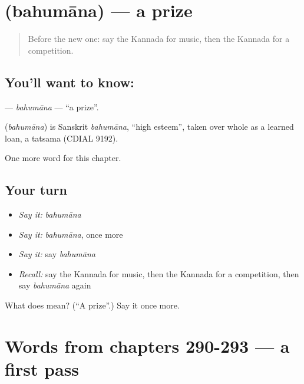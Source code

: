 \section[\texorpdfstring{\kn{ಬಹುಮಾನ} (bahumāna)}{ಬಹುಮಾನ (bahumāna)}]{ (bahumāna) — a prize}

\label{lesson:KA-C298-bahumana}



\begin{quote}
Before the new one: say the Kannada for music, then the Kannada for a competition.
\end{quote}

\subsection*{You'll want to know: }
\textbf{} — \emph{bahumāna} — \textquotedblleft{}a prize\textquotedblright{}.

\begin{cousinweb}
\textbf{} (\emph{bahumāna}) is Sanskrit \emph{bahumāna}, \textquotedblleft{}high esteem\textquotedblright{}, taken over whole as a learned loan, a tatsama (CDIAL 9192).
\end{cousinweb}

\begin{grammarlens}[title={What you've built}]
One more word for this chapter.
\end{grammarlens}

\subsection*{Your turn}
\begin{itemize}
\raggedright
  \item \emph{Say it:} \emph{bahumāna}
  \item \emph{Say it:} \emph{bahumāna}, once more
  \item \emph{Say it:} say \emph{bahumāna}
  \item \emph{Recall:} say the Kannada for music, then the Kannada for a competition, then say \emph{bahumāna} again
\end{itemize}

\begin{tcolorbox}[breakable,colback=teal!4,colframe=teal!35!black,title={Before you move on}]
What does  mean? (\textquotedblleft{}A prize\textquotedblright{}.) Say it once more.
\end{tcolorbox}
\section[(dialogue)]{Words from chapters 290-293 — a first pass}

